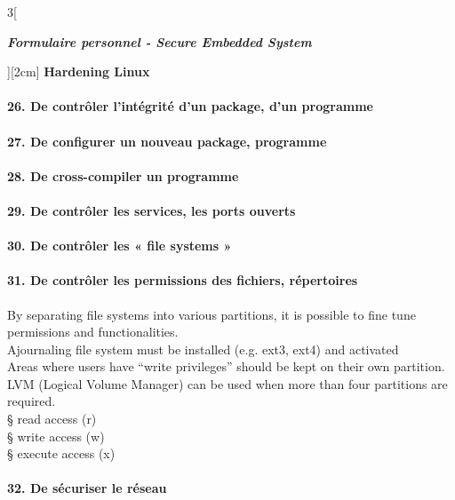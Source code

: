 \begin{multicols}{3}[\centerline{ \large\em \textbf{Formulaire personnel - Secure Embedded System}}][2cm]
{\Large \textbf{Hardening Linux}}\\
\paragraph*{26. De contrôler l’intégrité d’un package, d’un programme\\}
\paragraph*{27. De configurer un nouveau package, programme\\}
\paragraph*{28. De cross-compiler un programme\\}
\paragraph*{29. De contrôler les services, les ports ouverts\\}
\paragraph*{30. De contrôler les « file systems »\\}
\paragraph*{31. De contrôler les permissions des fichiers, répertoires\\}
By separating file systems into various partitions, it is possible to fine tune permissions and functionalities.\\
Ajournaling file system must be installed (e.g. ext3, ext4) and activated\\
Areas where users have “write privileges” should be kept on their own partition.\\
LVM (Logical Volume Manager) can be used when more than four partitions are required.\\
§ read access (r)\\
§ write access (w)\\
§ execute access (x)\\
\paragraph*{32. De sécuriser le réseau\\}

\end{multicols}
